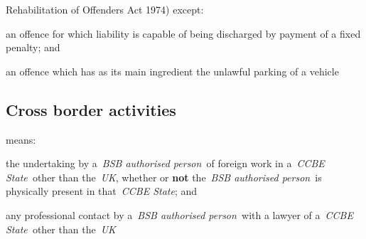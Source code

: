   Rehabilitation of Offenders Act 1974) except: \al \item an offence for which
  liability is capable of being discharged by payment of a fixed
  penalty; and \item an offence which has as its main ingredient the
  unlawful parking of a vehicle \la  \subsection{Cross border activities } means: \al \item the undertaking by
  a~\emph{BSB authorised person~}of foreign work in a~\emph{CCBE
  State~}other than the~\emph{UK}, whether or \textbf{not} the~\emph{BSB
  authorised person~}is physically present in that~\emph{CCBE State};
  and \item any professional contact by a~\emph{BSB authorised
  person~}with a lawyer of a~\emph{CCBE State~}other than
  the~\emph{UK}
  \la
